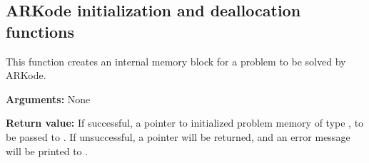 \documentclass[letterpaper,10pt,english]{sphinxmanual}
\begin{document}
\subsection{ARKode initialization and deallocation functions}
\label{c_interface/User_callable:arkode-initialization-and-deallocation-functions}\label{c_interface/User_callable:cinterface-initialization}

\begin{fulllineitems}
\label{c_interface/User_callable:c.ARKodeCreate}
This function creates an internal memory block for a problem to be
solved by ARKode.

\textbf{Arguments:}  None

\textbf{Return value:}  If successful, a pointer to initialized problem memory
of type , to be passed to {\hyperref[c_interface/User_callable:c.ARKodeInit]{\emph{}}}.
If unsuccessful, a  pointer will be returned, and an error
message will be printed to .

\end{fulllineitems}

\end{document}
